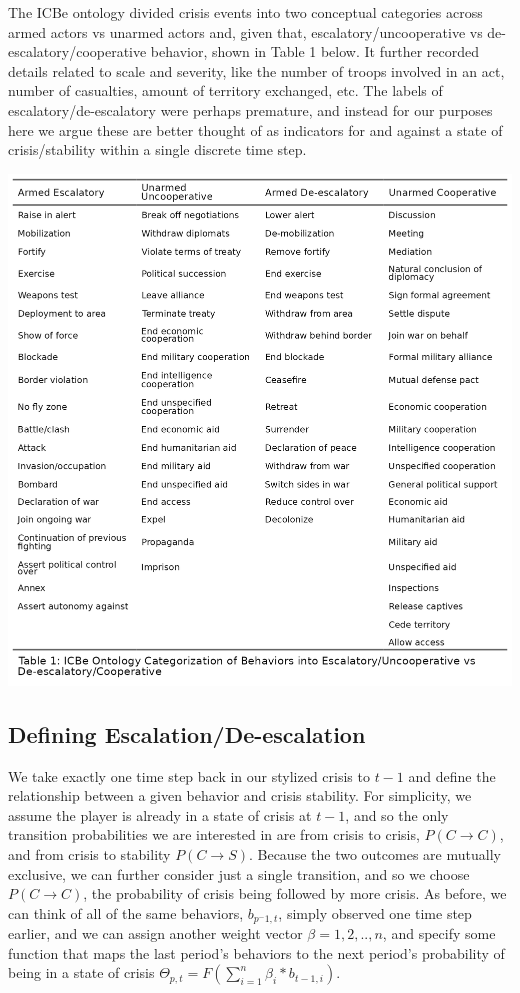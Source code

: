\documentclass[
]{article}
\begin{document}
The ICBe ontology divided crisis events into two conceptual categories
across armed actors vs unarmed actors and, given that,
escalatory/uncooperative vs de-escalatory/cooperative behavior, shown in
Table 1 below. It further recorded details related to scale and
severity, like the number of troops involved in an act, number of
casualties, amount of territory exchanged, etc. The labels of
escalatory/de-escalatory were perhaps premature, and instead for our
purposes here we argue these are better thought of as indicators for and
against a state of crisis/stability within a single discrete time step.

\includegraphics{Table1.png}

\subsection{Defining
Escalation/De-escalation}\label{defining-escalationde-escalation}

We take exactly one time step back in our stylized crisis to \(t-1\) and
define the relationship between a given behavior and crisis stability.
For simplicity, we assume the player is already in a state of crisis at
\(t-1\), and so the only transition probabilities we are interested in
are from crisis to crisis, \(P(C\rightarrow C)\), and from crisis to
stability \(P(C\rightarrow S)\). Because the two outcomes are mutually
exclusive, we can further consider just a single transition, and so we
choose \(P(C\rightarrow C)\), the probability of crisis being followed
by more crisis. As before, we can think of all of the same behaviors,
\(b_{p^-1,t}\), simply observed one time step earlier, and we can assign
another weight vector \(\beta=1,2,..,n\), and specify some function that
maps the last period's behaviors to the next period's probability of
being in a state of crisis
\(\Theta_{p,t} = F(\sum^n_{i=1}\beta_i * b_{t-1,i})\).
\end{document}
